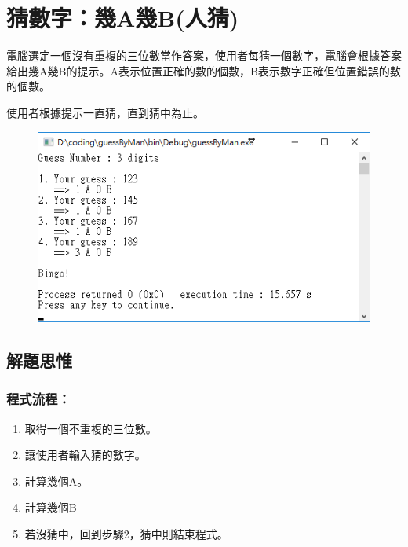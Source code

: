 \section{猜數字：幾A幾B(人猜)}

電腦選定一個沒有重複的三位數當作答案，使用者每猜一個數字，電腦會根據答案給出幾A幾B的提示。A表示位置正確的數的個數，B表示數字正確但位置錯誤的數的個數。

使用者根據提示一直猜，直到猜中為止。
\begin{figure}[H]
	\centering
	\includegraphics{fig/man}
\end{figure}
\subsection{解題思惟}

\subsubsection{程式流程：}
\begin{enumerate}
	\item 取得一個不重複的三位數。
	\item 讓使用者輸入猜的數字。
	\item 計算幾個A。
	\item 計算幾個B
	\item 若沒猜中，回到步驟2，猜中則結束程式。
\end{enumerate}

